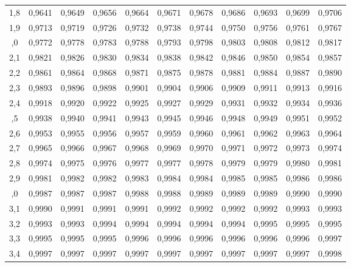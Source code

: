 \begin{tabular}{@{}c|*{10}{c}@{}}
1,8 & 0,9641 & 0,9649 & 0,9656 & 0,9664 & 0,9671 & 0,9678 & 0,9686 & 0,9693 & 0,9699 & 0,9706\\
1,9 & 0,9713 & 0,9719 & 0,9726 & 0,9732 & 0,9738 & 0,9744 & 0,9750 & 0,9756 & 0,9761 & 0,9767\\
\addlinespace[2pt]
2,0 & 0,9772 & 0,9778 & 0,9783 & 0,9788 & 0,9793 & 0,9798 & 0,9803 & 0,9808 & 0,9812 & 0,9817\\
2,1 & 0,9821 & 0,9826 & 0,9830 & 0,9834 & 0,9838 & 0,9842 & 0,9846 & 0,9850 & 0,9854 & 0,9857\\
2,2 & 0,9861 & 0,9864 & 0,9868 & 0,9871 & 0,9875 & 0,9878 & 0,9881 & 0,9884 & 0,9887 & 0,9890\\
2,3 & 0,9893 & 0,9896 & 0,9898 & 0,9901 & 0,9904 & 0,9906 & 0,9909 & 0,9911 & 0,9913 & 0,9916\\
2,4 & 0,9918 & 0,9920 & 0,9922 & 0,9925 & 0,9927 & 0,9929 & 0,9931 & 0,9932 & 0,9934 & 0,9936\\
\addlinespace[2pt]
2,5 & 0,9938 & 0,9940 & 0,9941 & 0,9943 & 0,9945 & 0,9946 & 0,9948 & 0,9949 & 0,9951 & 0,9952\\
2,6 & 0,9953 & 0,9955 & 0,9956 & 0,9957 & 0,9959 & 0,9960 & 0,9961 & 0,9962 & 0,9963 & 0,9964\\
2,7 & 0,9965 & 0,9966 & 0,9967 & 0,9968 & 0,9969 & 0,9970 & 0,9971 & 0,9972 & 0,9973 & 0,9974\\
2,8 & 0,9974 & 0,9975 & 0,9976 & 0,9977 & 0,9977 & 0,9978 & 0,9979 & 0,9979 & 0,9980 & 0,9981\\
2,9 & 0,9981 & 0,9982 & 0,9982 & 0,9983 & 0,9984 & 0,9984 & 0,9985 & 0,9985 & 0,9986 & 0,9986\\
\addlinespace[2pt]
3,0 & 0,9987 & 0,9987 & 0,9987 & 0,9988 & 0,9988 & 0,9989 & 0,9989 & 0,9989 & 0,9990 & 0,9990\\
3,1 & 0,9990 & 0,9991 & 0,9991 & 0,9991 & 0,9992 & 0,9992 & 0,9992 & 0,9992 & 0,9993 & 0,9993\\
3,2 & 0,9993 & 0,9993 & 0,9994 & 0,9994 & 0,9994 & 0,9994 & 0,9994 & 0,9995 & 0,9995 & 0,9995\\
3,3 & 0,9995 & 0,9995 & 0,9995 & 0,9996 & 0,9996 & 0,9996 & 0,9996 & 0,9996 & 0,9996 & 0,9997\\
3,4 & 0,9997 & 0,9997 & 0,9997 & 0,9997 & 0,9997 & 0,9997 & 0,9997 & 0,9997 & 0,9997 & 0,9998\\
\bottomrule\end{tabular}